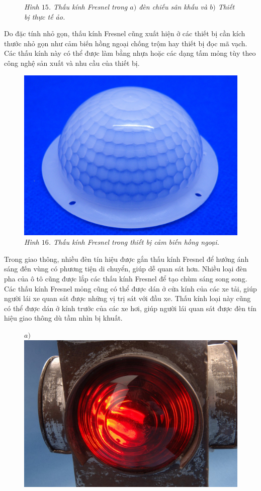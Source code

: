 \begin{multicols}{2}
\begin{figure}[H]
		\caption{\small\textit{\color{timhieukhoahoc}Hình $15$. Thấu kính Fresnel trong $a)$ đèn chiếu sân khấu và $b)$ Thiết bị thực tế ảo.}}
		\vspace*{-10pt}
	\end{figure}
	Do đặc tính nhỏ gọn, thấu kính Fresnel cũng xuất hiện ở các thiết bị cần kích thước nhỏ gọn như cảm biến hồng ngoại chống trộm hay thiết bị đọc mã vạch. Các thấu kính này có thể được làm bằng nhựa hoặc các dạng tấm mỏng tùy theo công nghệ sản xuất và nhu cầu của thiết bị.
	\begin{figure}[H]
		\vspace*{-5pt}
		\centering
		\captionsetup{labelformat= empty, justification=centering}
		\includegraphics[width= 0.7\linewidth]{17}
		\caption{\small\textit{\color{timhieukhoahoc}Hình $16$. Thấu kính Fresnel trong thiết bị cảm biến hồng ngoại.}}
		\vspace*{-10pt}
	\end{figure}
	Trong giao thông, nhiều đèn tín hiệu được gắn thấu kính Fresnel để hướng ánh sáng đến vùng có phương tiện di chuyển, giúp dễ quan sát hơn. Nhiều loại đèn pha của ô tô cũng được lắp các thấu kính Fresnel để tạo chùm sáng song song. Các thấu kính Fresnel mỏng cũng có thể được dán ở cửa kính của các xe tải, giúp người lái xe quan sát được những vị trị sát với đầu xe. Thấu kính loại này cũng có thể được dán ở kính trước của các xe hơi, giúp người lái quan sát được đèn tín hiệu giao thông dù tầm nhìn bị khuất.
	\begin{figure}[H]
		\vspace*{-5pt}
		\centering
		\captionsetup{labelformat= empty, justification=centering}
		$a)$\includegraphics[height= 0.3\linewidth]{18a}

\end{figure}
\end{multicols}
